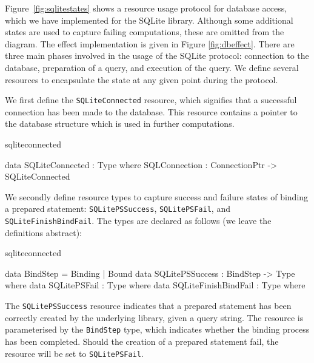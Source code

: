 Figure~\ref{fig:sqlitestates} shows a resource usage protocol for database
access, which we have implemented for the SQLite library. Although some
additional states are used to capture failing computations, these are omitted
from the diagram.
The effect implementation is given in Figure \ref{fig:dbeffect}.
%
There are three main phases involved in the usage of the SQLite protocol:
connection to the database, preparation of a query, and execution of the query.
We define several resources to encapsulate the state at any given point during the protocol.

We first define the \texttt{SQLiteConnected} resource, which signifies that a
successful connection has been made to the database. This resource contains a
pointer to the database structure which is used in further computations.

\begin{SaveVerbatim}{sqliteconnected}

data SQLiteConnected : Type where
  SQLConnection : ConnectionPtr -> SQLiteConnected
  
\end{SaveVerbatim}  

\noindent
We secondly define resource types to capture success and failure states
of binding a prepared statement:
\texttt{SQLitePSSuccess}, 
\texttt{SQLitePSFail}, and \texttt{SQLiteFinishBindFail}. The types are
declared as follows (we leave the definitions abstract):

\begin{SaveVerbatim}{sqliteconnected}

data BindStep = Binding | Bound
data SQLitePSSuccess : BindStep -> Type where
data SQLitePSFail : Type where
data SQLiteFinishBindFail : Type where

\end{SaveVerbatim}

%


\noindent
The \texttt{SQLitePSSuccess} resource indicates that a prepared statement has been correctly created by the underlying library, given a query string. The resource is parameterised by the \texttt{BindStep} type, which indicates whether the binding process has been completed. Should the creation of a prepared statement fail, the resource will be set to \texttt{SQLitePSFail}. 


